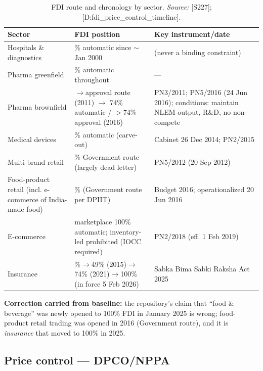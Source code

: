 \documentclass[11pt,a4paper]{article}
\newcommand{\cs}[1]{\textnormal{[#1]}}
\begin{document}
\begin{table}[htbp]
\centering
\small
\caption{FDI route and chronology by sector. \textit{Source:} \cs{S227}; \cs{D:fdi\_price\_control\_timeline}.}
\label{tab:fdiroute}
\begin{tabularx}{\textwidth}{@{}>{\raggedright\arraybackslash}p{3.6cm} >{\raggedright\arraybackslash}p{4.6cm} >{\raggedright\arraybackslash}X@{}}
\toprule
\textbf{Sector} & \textbf{FDI position} & \textbf{Key instrument/date} \\
\midrule
Hospitals \& diagnostics & 100\% automatic since $\sim$Jan 2000 & (never a binding constraint) \\
Pharma greenfield & 100\% automatic throughout & --- \\
Pharma brownfield & $\rightarrow$approval route (2011) $\rightarrow$ 74\% automatic / $>$74\% approval (2016) & PN3/2011; PN5/2016 (24 Jun 2016); conditions: maintain NLEM output, R\&D, no non-compete \\
Medical devices & 100\% automatic (carve-out) & Cabinet 26 Dec 2014; PN2/2015 \\
Multi-brand retail & 51\% Government route (largely dead letter) & PN5/2012 (20 Sep 2012) \\
Food-product retail (incl. e-commerce of India-made food) & 100\% (Government route per DPIIT) & Budget 2016; operationalized 20 Jun 2016 \\
E-commerce & marketplace 100\% automatic; inventory-led prohibited (IOCC required) & PN2/2018 (eff. 1 Feb 2019) \\
Insurance & 26\%$\rightarrow$49\% (2015)$\rightarrow$74\% (2021)$\rightarrow$100\% (in force 5 Feb 2026) & Sabka Bima Sabki Raksha Act 2025 \\
\bottomrule
\end{tabularx}
\end{table}

\textbf{Correction carried from baseline:} the repository's claim that ``food \& beverage'' was newly opened to 100\% FDI in January 2025 is wrong; food-product retail trading was opened in 2016 (Government route), and it is \emph{insurance} that moved to 100\% in 2025.

\subsection{Price control --- DPCO/NPPA}
\end{document}
